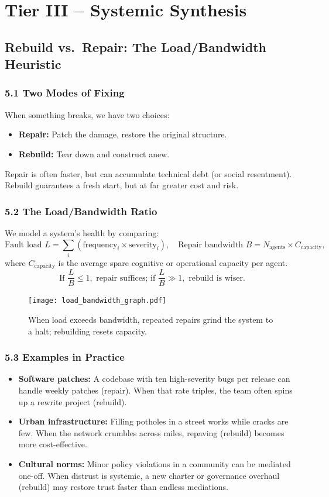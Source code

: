 \documentclass{book}       %
\begin{document}
\part{Tier III – Systemic Synthesis}

\chapter{Rebuild vs.\ Repair: The Load/Bandwidth Heuristic}

\section*{5.1  Two Modes of Fixing}
When something breaks, we have two choices:
\begin{itemize}[noitemsep]
  \item \textbf{Repair:} Patch the damage, restore the original structure.  
  \item \textbf{Rebuild:} Tear down and construct anew.  
\end{itemize}
Repair is often faster, but can accumulate technical debt (or social resentment).  
Rebuild guarantees a fresh start, but at far greater cost and risk.

\section*{5.2  The Load/Bandwidth Ratio}
We model a system’s health by comparing:
\[
\text{Fault load } L = \sum_i (\text{frequency}_i \times \text{severity}_i),
\quad
\text{Repair bandwidth } B = N_{\text{agents}} \times C_{\text{capacity}},
\]
where $C_{\text{capacity}}$ is the average spare cognitive or operational capacity per agent.  
\[
\text{If } \frac{L}{B} \le 1,\text{ repair suffices; if } \frac{L}{B} \gg 1,\text{ rebuild is wiser.}
\]

\begin{figure}[h]
  \centering
  \texttt{[image: load\_bandwidth\_graph.pdf]}
  \caption{When load exceeds bandwidth, repeated repairs grind the system to a halt; rebuilding resets capacity.}
\end{figure}

\section*{5.3  Examples in Practice}
\begin{itemize}[noitemsep]
  \item \textbf{Software patches:}  
    A codebase with ten high-severity bugs per release can handle weekly patches (repair).  
    When that rate triples, the team often spins up a rewrite project (rebuild).  
  \item \textbf{Urban infrastructure:}  
    Filling potholes in a street works while cracks are few.  
    When the network crumbles across miles, repaving (rebuild) becomes more cost-effective.  
  \item \textbf{Cultural norms:}  
    Minor policy violations in a community can be mediated one-off.  
    When distrust is systemic, a new charter or governance overhaul (rebuild) may restore trust faster than endless mediations.  
\end{itemize}
\end{document}
